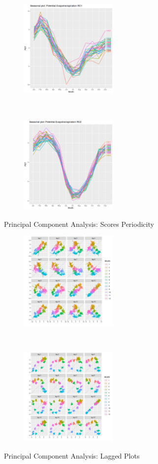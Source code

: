 \documentclass[12pt,a4paper]{article}
\begin{document}
\begin{figure}[!h]
    \centering
    \begin{subfigure}[t]{0.5\textwidth}
        \centering
        \includegraphics[height=1.9in]{./gaphics/q003_d.png}
        \caption{}
    \end{subfigure}%
    ~ 
    \begin{subfigure}[t]{0.5\textwidth}
        \centering
        \includegraphics[height=1.9in]{./gaphics/q003_e.png}
        \caption{}
    \end{subfigure}
    \caption{Principal Component Analysis: Scores Periodicity}
\end{figure}

\begin{figure}[!h]
    \centering
    \begin{subfigure}[t]{0.5\textwidth}
        \centering
        \includegraphics[height=1.9in]{./gaphics/q003_f.png}
        \caption{}
    \end{subfigure}%
    ~ 
    \begin{subfigure}[t]{0.5\textwidth}
        \centering
        \includegraphics[height=1.9in]{./gaphics/q003_g.png}
        \caption{}
    \end{subfigure}
    \caption{Principal Component Analysis: Lagged Plots}
\end{figure}
\end{document}
